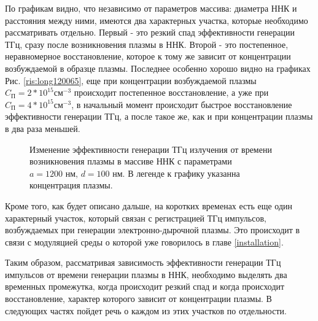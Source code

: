 \documentclass[a4paper,14pt,russian]{extreport}
\begin{document}
				По графикам видно, что независимо от параметров массива: диаметра ННК и расстояния между ними, имеются два характерных участка, которые необходимо рассматривать отдельно. Первый - это резкий спад эффективности генерации ТГц, сразу после возникновения плазмы в ННК. Второй - это постепенное, неравномерное восстановление, которое к тому же зависит от концентрации возбуждаемой в образце плазмы. Последнее особенно хорошо видно на графиках Рис. \ref{ris:long120065}, еще при концентрации возбуждаемой плазмы $C_{\text{П}} = 2*10^{15} \text{см}^{-3}$ происходит постепенное восстановление, а уже при $C_{\text{П}} = 4*10^{15} \text{см}^{-3}$, в начальный момент происходит быстрое восстановление эффективности генерации ТГц, а после такое же, как и при концентрации плазмы в два раза меньшей.\par
				\begin{figure}[h!]
					\caption{Изменение эффективности генерации ТГц излучения от времени возникновения плазмы в массиве ННК с параметрами $a = 1200 \text{ нм, } d = 100 \text{ нм}$. В легенде к графику указанна концентрация плазмы.}
				\label{ris:long1200100}
				\end{figure}
				Кроме того, как будет описано дальше, на коротких временах есть еще один характерный участок, который связан с регистрацией ТГц импульсов, возбуждаемых при генерации электронно-дырочной плазмы. Это происходит в связи с модуляцией среды о которой уже говорилось в главе \ref{installation}. \par
				Таким образом, рассматривая зависимость эффективности генерации ТГц импульсов от времени генерации плазмы в ННК, необходимо выделять два временных промежутка, когда происходит резкий спад и когда происходит восстановление, характер которого зависит от концентрации плазмы. В следующих частях пойдет речь о каждом из этих участков по отдельности.
\end{document}
